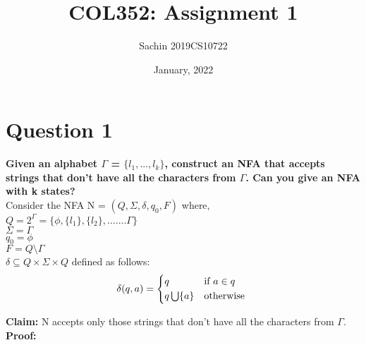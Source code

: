 \documentclass{article}
\title{COL352: Assignment 1}
\author{Sachin 2019CS10722 }
\date{January, 2022}
\begin{document}
\maketitle

\section{Question 1}

\textbf{Given an alphabet $\Gamma $ = $\{l_1,...,l_k\}$, construct an NFA that accepts strings that don't have
all the characters from $\Gamma $. Can you give an NFA with k states?}\\

Consider the NFA N = {$(Q, \Sigma, \delta, q_0 , F )$} where,\\
$Q = 2^\Gamma = \{\phi, \{l_1\}, \{l_2\}, ....... \Gamma\}$\\
$\Sigma = \Gamma$\\
$q_0 = \phi$\\
$F = Q \setminus  \Gamma$\\
$\delta \subseteq Q \times \Sigma \times Q$ defined as follows:\\

\begin{equation}
    \delta (q,a) = 
    \begin{cases*}
      q & if $a \in q$ \\
      q \bigcup \{a\}        & otherwise
    \end{cases*}
\end{equation}

\textbf{Claim: } N accepts only those strings that don't have all the characters from $\Gamma $.\\

\textbf{Proof: } \\
\end{document}

